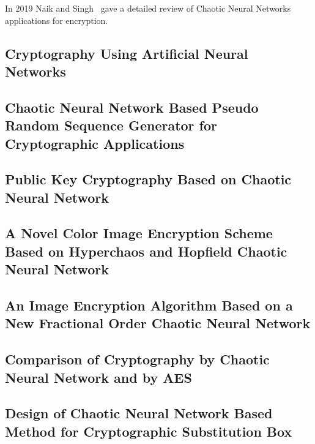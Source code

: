 \documentclass[conference]{IEEEtran}
\begin{document}
In 2019 Naik and Singh~\cite{Naik2022} gave a detailed review of Chaotic Neural Networks applications for encryption.


\subsection{\textbf{Cryptography Using Artificial Neural Networks}}\label{subsec:cryptography-using-artificial-neural-networks}
\cite{Gujral}

\subsection{\textbf{Chaotic Neural Network Based Pseudo Random Sequence Generator for Cryptographic Applications}}\label{subsec:chaotic-neural-network-based-pseudo-random-sequence-generator-for-cryptographic-applications}
\cite{Lokesh}
\subsection{\textbf{Public Key Cryptography Based on Chaotic Neural Network}}\label{subsec:public-key-cryptography-based-on-chaotic-neural-network}
\cite{Hamdy}
\subsection{\textbf{A Novel Color Image Encryption Scheme Based on Hyperchaos and Hopfield Chaotic Neural Network}}\label{subsec:a-novel-color-image-encryption-scheme-based-on-hyperchaos-and-hopfield-chaotic-neural-network}
\cite{Wu2022}
\subsection{\textbf{An Image Encryption Algorithm Based on a New Fractional Order Chaotic Neural Network}}\label{subsec:an-image-encryption-algorithm-based-on-a-new-fractional-order-chaotic-neural-network}
\cite{Li2022}
\subsection{\textbf{Comparison of Cryptography by Chaotic Neural Network and by AES}}\label{subsec:comparison-of-cryptography-by-chaotic-neural-network-and-by-aes}
\cite{Skovajsova2019}
\subsection{\textbf{Design of Chaotic Neural Network Based Method for Cryptographic Substitution Box}}\label{subsec:design-of-chaotic-neural-network-based-method-for-cryptographic-substitution-box}
\cite{Ahmad2016}
\end{document}
